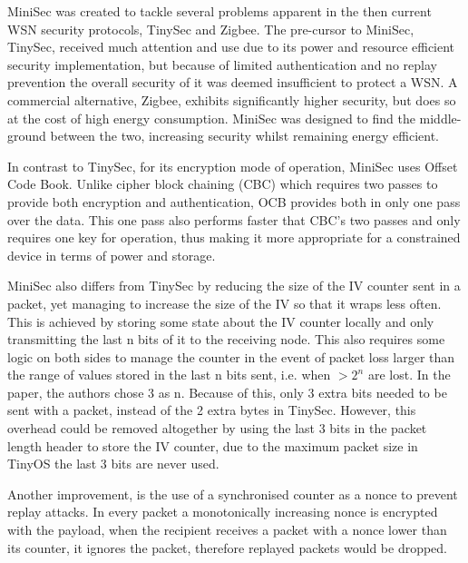 MiniSec was created to tackle several problems apparent in the then current WSN security protocols, TinySec and Zigbee. The pre-cursor to MiniSec, TinySec, received much attention and use due to its power and resource efficient security implementation, but because of limited authentication and no replay prevention the overall security of it was deemed insufficient to protect a WSN. A commercial alternative, Zigbee, exhibits significantly higher security, but does so at the cost of high energy consumption. MiniSec was designed to find the middle-ground between the two, increasing security whilst remaining energy efficient. 

In contrast to TinySec, for its encryption mode of operation, MiniSec uses Offset Code Book. Unlike cipher block chaining (CBC) which requires two passes to provide both encryption and authentication, OCB provides both in only one pass over the data. This one pass also performs faster that CBC's two passes and only requires one key for operation, thus making it more appropriate for a constrained device in terms of power and storage. 

MiniSec also differs from TinySec by reducing the size of the IV counter sent in a packet, yet managing to increase the size of the IV so that it wraps less often. This is achieved by storing some state about the IV counter locally and only transmitting the last n bits of it to the receiving node. This also requires some logic on both sides to manage the counter in the event of packet loss larger than the range of values stored in the last n bits sent, i.e. when $>2^n$ are lost. In the paper, the authors chose 3 as n. Because of this, only 3 extra bits needed to be sent with a packet, instead of the 2 extra bytes in TinySec. However, this overhead could be removed altogether by using the last 3 bits in the packet length header to store the IV counter, due to the maximum packet size in TinyOS the last 3 bits are never used.

Another improvement, is the use of a synchronised counter as a nonce to prevent replay attacks. In every packet a monotonically increasing nonce is encrypted with the payload, when the recipient receives a packet with a nonce lower than its counter, it ignores the packet, therefore replayed packets would be dropped. 
